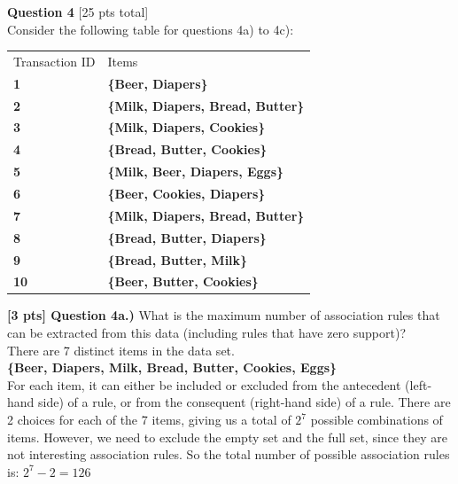 \documentclass[paper=a4, fontsize=11pt]{scrartcl} %
\begin{document}
\vspace{10mm}

{\Large \textbf{Question 4} [25 pts total]} \\
 
Consider the following table for questions 4a) to 4c):\\
\begin{center}
\begin{tabular}{ll}
Transaction ID & Items \\
\rowcolor[HTML]{DEEBF6} 
\textbf{1}     & \textbf{\{Beer, Diapers\}} \\
\rowcolor[HTML]{DEEBF6} 
\textbf{2}     & \textbf{\{Milk, Diapers, Bread, Butter\}} \\
\rowcolor[HTML]{DEEBF6} 
\textbf{3}     & \textbf{\{Milk, Diapers, Cookies\}} \\
\rowcolor[HTML]{DEEBF6} 
\textbf{4}     & \textbf{\{Bread, Butter, Cookies\}} \\
\rowcolor[HTML]{DEEBF6} 
\textbf{5}     & \textbf{\{Milk, Beer, Diapers, Eggs\}} \\
\rowcolor[HTML]{DEEBF6} 
\textbf{6}     & \textbf{\{Beer, Cookies, Diapers\}} \\
\rowcolor[HTML]{DEEBF6} 
\textbf{7}     & \textbf{\{Milk, Diapers, Bread, Butter\}} \\
\rowcolor[HTML]{DEEBF6} 
\textbf{8}     & \textbf{\{Bread, Butter, Diapers\}} \\
\rowcolor[HTML]{DEEBF6} 
\textbf{9}     & \textbf{\{Bread, Butter, Milk\}} \\
\rowcolor[HTML]{DEEBF6} 
\textbf{10}    & \textbf{\{Beer, Butter, Cookies\}}    
\end{tabular}
\end{center}

\vspace{8mm}

\textbf{[3 pts] Question 4a.)} What is the maximum number of association rules that can be extracted from this data (including rules that have zero support)? \\

There are 7 distinct items in the data set. \\
\textbf{\{Beer, Diapers, Milk, Bread, Butter, Cookies, Eggs\}} \\
For each item, it can either be included or excluded from the antecedent (left-hand side) of a rule, or from the consequent (right-hand side) of a rule. There are 2 choices for each of the 7 items, giving us a total of $2^7$ possible combinations of items. However, we need to exclude the empty set and the full set, since they are not interesting association rules. So the total number of possible association rules is:
$2^7 - 2 = 126$ \\
\end{document}
